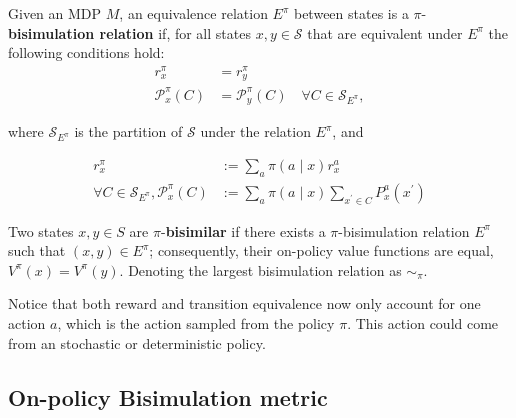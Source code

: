 \begin{definition}
\label{def:on-policy-bisimulation}
Given an MDP $M$, an equivalence relation $E^\pi$ between states is a $\pi$-\textbf{bisimulation relation} if, for all states $x, y \in \mathcal{S}$ that are equivalent under $E^\pi$ the following conditions hold:
\begin{align}
\label{eq:on_policy_reward_equivalence}
r_{x}^\pi & = r_{y}^\pi
 \\
\label{eq:on_policy_transition_equivalence}
\mathcal{P}_{x}^\pi\left(C \right) & =\mathcal{P}_{y}^\pi\left(C\right) \quad \forall C \in \mathcal{S}_{E^\pi},
\end{align}

where $\mathcal{S}_{E^\pi}$ is the partition of $\mathcal{S}$ under the relation $E^\pi$, and

\begin{equation}
\begin{aligned}
\label{eq:on_policy_reward_transition}
r_x^\pi & :=\sum_a \pi(a \mid x) r_x^a \\
\forall C \in \mathcal{S}_{E^\pi}, \mathcal{P}_x^\pi(C) & :=\sum_a \pi(a \mid x) \sum_{x^{\prime} \in C} P_x^a(x^{\prime})
\end{aligned}
\end{equation}

Two states $x, y \in S$ are $\pi$-\textbf{bisimilar} if there exists a $\pi$-bisimulation relation $E^\pi$ such that $(x, y) \in E^\pi$; consequently, their on-policy value functions are equal, \(V^\pi(x) = V^\pi(y)\). Denoting the largest bisimulation relation as $\sim_\pi$.
\end{definition}

Notice that both reward and transition equivalence now only account for one action $a$, which is the action sampled from the policy $\pi$. This action could come from an stochastic or deterministic policy. 


\subsection{On-policy Bisimulation metric}

